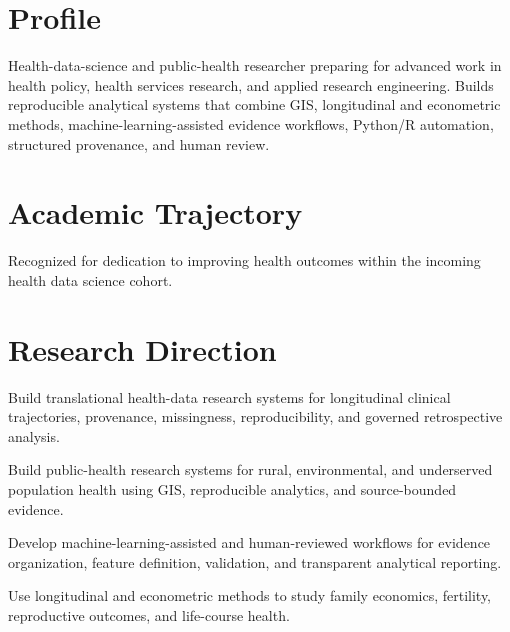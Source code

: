 \documentclass[10.5pt,letterpaper]{article}
\begin{document}

\section*{Profile}
Health-data-science and public-health researcher preparing for advanced work in health policy, health services research, and applied research engineering. Builds reproducible analytical systems that combine GIS, longitudinal and econometric methods, machine-learning-assisted evidence workflows, Python/R automation, structured provenance, and human review.

\section*{Academic Trajectory}


\begin{cvbullets}
    \item Recognized for dedication to improving health outcomes within the incoming health data science cohort.
\end{cvbullets}

\section*{Research Direction}
\begin{cvbullets}
    \item Build translational health-data research systems for longitudinal clinical trajectories, provenance, missingness, reproducibility, and governed retrospective analysis.
    \item Build public-health research systems for rural, environmental, and underserved population health using GIS, reproducible analytics, and source-bounded evidence.
    \item Develop machine-learning-assisted and human-reviewed workflows for evidence organization, feature definition, validation, and transparent analytical reporting.
    \item Use longitudinal and econometric methods to study family economics, fertility, reproductive outcomes, and life-course health.
\end{cvbullets}
\end{document}
